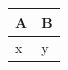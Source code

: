 \begin{tabular}{>{\raggedright\arraybackslash}p{}>{\raggedleft\arraybackslash}p{}}
\toprule
A & B\\
\midrule
x & y\\
\bottomrule
\end{tabular}
